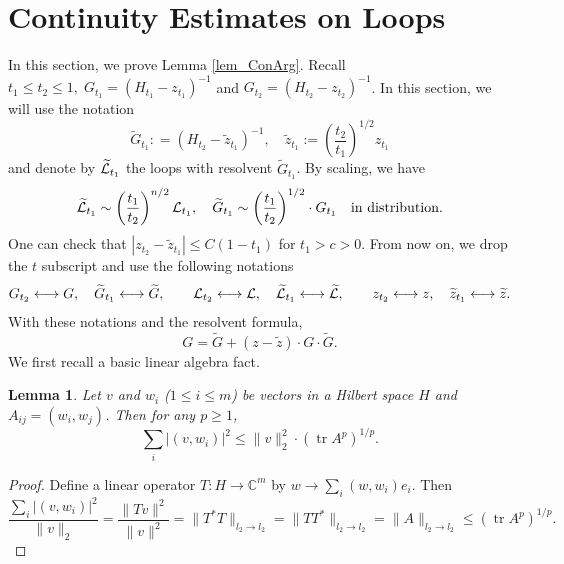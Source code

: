 \documentclass[10pt,reqno]{article}
\theoremstyle{plain} %
\newtheorem{lemma}[theorem]{Lemma}
\theoremstyle{remark}
\numberwithin{equation}{section}
\begin{document}
\section{Continuity Estimates on Loops}\label{sec:Inh_LE}
In this section, we  prove  Lemma \ref{lem_ConArg}. Recall  $t_1\le t_2\le 1, \; G_{t_1}=(H_{t_1}-z_{t_1})^{-1}$ and  $G_{t_2}=(H_{t_2}-z_{t_2})^{-1} $.
In this section, we will use the notation 
$$
\widetilde{ G}_{t_1}: = 
\left(  H_{t_2}-
 \widetilde z_{t_1}\right)^{-1},\quad 
 \widetilde z_{t_1}:=\left(\frac{t_2}{t_1}\right)^{1/2}z_{t_1}
$$
and denote by   \(\widetilde{\cal L}_{t_1}\)  the loops   with resolvent  \(\widetilde{G}_{t_1}\).
By scaling, we have 
\begin{equation}\label{calLcalL}
  \widetilde{\cal L}_{t_1}\sim \left(\frac{t_1}{t_2}\right)^{n/2} {\cal L}_{t_1}, \quad  
  \widetilde{ G}_{t_1}\sim \left(\frac{t_1}{t_2}\right)^{1/2}\cdot { G}_{t_1} \quad \hbox{in distribution}.  
\end{equation}
One can check that $|z_{t_2}-\widetilde{z}_{t_1}|\le C(1-t_1)$ for  $t_1>c>0$.   From now on,  we drop the $t$ subscript 
and use the following notations 
\begin{align}\label{GGLLzz}
G_{t_2} \longleftrightarrow  G,\quad \widetilde{G}_{t_1} \longleftrightarrow   \widetilde{G},\quad\quad
{\cal L}_{t_2} \longleftrightarrow  {\cal L},\quad \widetilde{{\cal L}}_{t_1} \longleftrightarrow   \widetilde{{\cal L}},
\quad\quad
{z}_{t_2} \longleftrightarrow  {z},\quad \widetilde{{z}}_{t_1} \longleftrightarrow   \widetilde{{z}}.
\end{align}
With these notations and the resolvent formula, 
\begin{equation}\label{GGZGG}
  G=\widetilde{G}+(z-\widetilde{z})\cdot G\cdot \widetilde{G}  .
\end{equation}
We first recall a basic linear algebra fact. 

\begin{lemma}\label{lem_L2Loc}
Let $v$ and $w_i$ ($1 \le i \le m$) be vectors in a Hilbert space $H$ and  $A_{ij} = (w_i, w_j)$.
Then for any $p \ge 1$,
$$
\sum_i |(v, w_i)|^2 \le \|v\|_2^2 \cdot (\operatorname{tr} A^p)^{1/p}.
$$
\end{lemma}

\begin{proof}
Define a linear operator $T: H \to \mathbb{C}^m$ by $w \to \sum_i (w, w_i) e_i$. Then
$$
\frac{\sum_i |(v, w_i)|^2}{\|v\|_2} = \frac{\|Tv\|^2}{\|v\|^2} = \|T^* T\|_{l_2 \to l_2} = \|TT^*\|_{l_2 \to l_2} = \|A\|_{l_2 \to l_2} \le (\operatorname{tr} A^p)^{1/p}.
$$
\end{proof}
\end{document}
